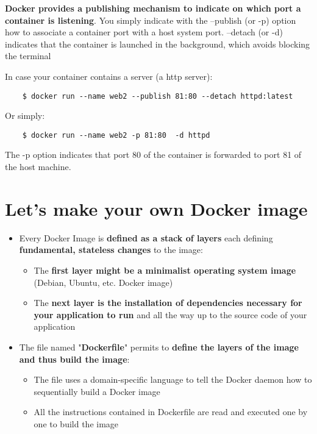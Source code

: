 \documentclass[handout]{beamer}[10pt, usepdftitle=false]
\begin{document}
	\begin{frame}[fragile]

	\textbf{Docker provides a publishing mechanism to indicate on which port a container is listening}. 
	You simply indicate with the --publish (or -p) option how to associate a container port with a host system port. 
	--detach (or -d) indicates that the container is launched in the background, which avoids blocking the terminal	
	\vspace*{0.6em}
	
	In case your container contains a server (a http server):
	\vspace*{0.6em}	
	
	\begin{verbatim}	
	$ docker run --name web2 --publish 81:80 --detach httpd:latest
	\end{verbatim}
	
	Or simply:
	\vspace*{0.6em}
	
	\begin{verbatim}
	$ docker run --name web2 -p 81:80  -d httpd
	\end{verbatim}		
	
	The -p option indicates that port 80 of the container is forwarded to port 81 of the host machine.
	
	\end{frame}
	\section{Let's make your own Docker image}
	\begin{frame}
	
	\begin{itemize}
	\item{Every Docker Image is \textbf{defined as a stack of layers} each defining \textbf{fundamental, stateless changes} to the image:
		\begin{itemize}
			\item{The \textbf{first layer might be a minimalist operating system image} (Debian, Ubuntu, etc. Docker image)}
			\item{The \textbf{next layer is the installation of dependencies necessary for your application to run} and all the way up to the source code of your application}
		\end{itemize}			
	}
	\item{The file named "\textbf{Dockerfile}" permits to \textbf{define the layers of the image and thus build the image}:
		\begin{itemize}
			\item{The file uses a domain-specific language to tell the Docker daemon how to sequentially build a Docker image}
			\item{All the instructions contained in Dockerfile are read and executed one by one to build the image}
		\end{itemize}
	
	}
	\end{itemize}	
	
	
	\end{frame}	
	
\end{document}
